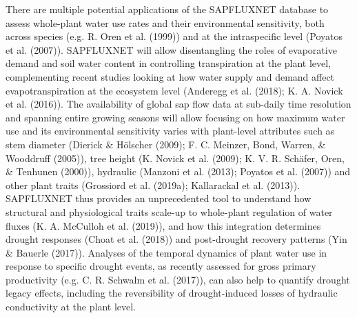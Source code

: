 \documentclass[11pt,twoside]{reedthesis}
\begin{document}
There are multiple potential applications of the SAPFLUXNET database to
assess whole-plant water use rates and their environmental sensitivity,
both across species (e.g. R. Oren et al. (1999)) and at the
intraspecific level (Poyatos et al. (2007)). SAPFLUXNET will allow
disentangling the roles of evaporative demand and soil water content in
controlling transpiration at the plant level, complementing recent
studies looking at how water supply and demand affect evapotranspiration
at the ecosystem level (Anderegg et al. (2018); K. A. Novick et al.
(2016)). The availability of global sap flow data at sub-daily time
resolution and spanning entire growing seasons will allow focusing on
how maximum water use and its environmental sensitivity varies with
plant-level attributes such as stem diameter (Dierick \& Hölscher
(2009); F. C. Meinzer, Bond, Warren, \& Wooddruff (2005)), tree height
(K. Novick et al. (2009); K. V. R. Schäfer, Oren, \& Tenhunen (2000)),
hydraulic (Manzoni et al. (2013); Poyatos et al. (2007)) and other plant
traits (Grossiord et al. (2019a); Kallarackal et al. (2013)). SAPFLUXNET
thus provides an unprecedented tool to understand how structural and
physiological traits scale-up to whole-plant regulation of water fluxes
(K. A. McCulloh et al. (2019)), and how this integration determines
drought responses (Choat et al. (2018)) and post-drought recovery
patterns (Yin \& Bauerle (2017)). Analyses of the temporal dynamics of
plant water use in response to specific drought events, as recently
assessed for gross primary productivity (e.g. C. R. Schwalm et al.
(2017)), can also help to quantify drought legacy effects, including the
reversibility of drought-induced losses of hydraulic conductivity at the
plant level.\par
\end{document}

